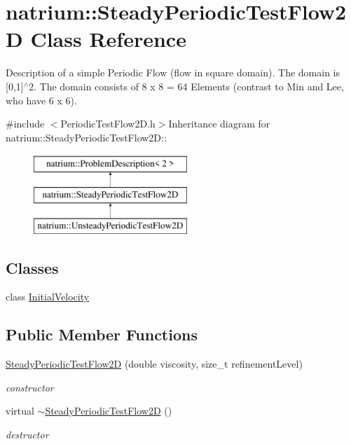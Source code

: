 \hypertarget{classnatrium_1_1SteadyPeriodicTestFlow2D}{
\section{natrium::SteadyPeriodicTestFlow2D Class Reference}
\label{classnatrium_1_1SteadyPeriodicTestFlow2D}
}


Description of a simple Periodic Flow (flow in square domain). The domain is \mbox{[}0,1\mbox{]}$^\wedge$2. The domain consists of 8 x 8 = 64 Elements (contrast to Min and Lee, who have 6 x 6).  


{\ttfamily \#include $<$PeriodicTestFlow2D.h$>$}Inheritance diagram for natrium::SteadyPeriodicTestFlow2D::\begin{figure}[H]
\begin{center}
\leavevmode
\includegraphics[height=3cm]{classnatrium_1_1SteadyPeriodicTestFlow2D}
\end{center}
\end{figure}
\subsection*{Classes}
\begin{DoxyCompactItemize}
\item 
class \hyperlink{classnatrium_1_1SteadyPeriodicTestFlow2D_1_1InitialVelocity}{InitialVelocity}
\end{DoxyCompactItemize}
\subsection*{Public Member Functions}
\begin{DoxyCompactItemize}
\item 
\hyperlink{classnatrium_1_1SteadyPeriodicTestFlow2D_a7db4598e86b34158612497ea2ff0ca74}{SteadyPeriodicTestFlow2D} (double viscosity, size\_\-t refinementLevel)
\begin{DoxyCompactList}\small\item\em constructor \item\end{DoxyCompactList}\item 
\hypertarget{classnatrium_1_1SteadyPeriodicTestFlow2D_a7344b71a404f2c4bbc73c1c738fdfa22}{
virtual \hyperlink{classnatrium_1_1SteadyPeriodicTestFlow2D_a7344b71a404f2c4bbc73c1c738fdfa22}{$\sim$SteadyPeriodicTestFlow2D} ()}
\label{classnatrium_1_1SteadyPeriodicTestFlow2D_a7344b71a404f2c4bbc73c1c738fdfa22}

\begin{DoxyCompactList}\small\item\em destructor \item\end{DoxyCompactList}\end{DoxyCompactItemize}


